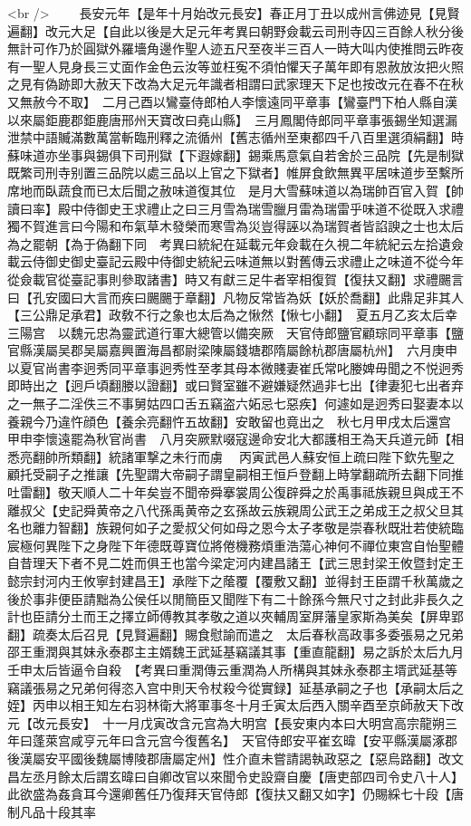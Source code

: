 <br />
　　長安元年【是年十月始改元長安】春正月丁丑以成州言佛迹見【見賢遍翻】改元大足【自此以後是大足元年考異曰朝野僉載云司刑寺囚三百餘人秋分後無計可作乃於圓獄外羅墻角邊作聖人迹五尺至夜半三百人一時大叫内使推問云昨夜有一聖人見身長三丈面作金色云汝等並枉寃不須怕懼天子萬年即有恩赦放汝把火照之見有偽跡即大赦天下改為大足元年識者相謂曰武家理天下足也按改元在春不在秋又無赦今不取】　二月己酉以鸞臺侍郎柏人李懷遠同平章事【鸞臺門下柏人縣自漢以來屬鉅鹿郡鉅鹿唐邢州天寶改曰堯山縣】　三月鳳閣侍郎同平章事張錫坐知選漏泄禁中語贓滿數萬當斬臨刑釋之流循州【舊志循州至東都四千八百里選須絹翻】時蘇味道亦坐事與錫俱下司刑獄【下遐嫁翻】錫乘馬意氣自若舍於三品院【先是制獄既繁司刑寺别置三品院以處三品以上官之下獄者】帷屏食飲無異平居味道步至繫所席地而臥蔬食而已太后聞之赦味道復其位　是月大雪蘇味道以為瑞帥百官入賀【帥讀曰率】殿中侍御史王求禮止之曰三月雪為瑞雪臘月雷為瑞雷乎味道不從既入求禮獨不賀進言曰今陽和布氣草木發榮而寒雪為災豈得誣以為瑞賀者皆諂諛之士也太后為之罷朝【為于偽翻下同　考異曰統紀在延載元年僉載在久視二年統紀云左拾遺僉載云侍御史御史臺記云殿中侍御史統紀云味道無以對舊傳云求禮止之味道不從今年從僉載官從臺記事則參取諸書】時又有獻三足牛者宰相復賀【復扶又翻】求禮颺言曰【孔安國曰大言而疾曰颺颺于章翻】凡物反常皆為妖【妖於喬翻】此鼎足非其人【三公鼎足承君】政敎不行之象也太后為之愀然【愀七小翻】　夏五月乙亥太后幸三陽宫　以魏元忠為靈武道行軍大總管以備突厥　天官侍郎鹽官顧琮同平章事【鹽官縣漢屬吴郡吴屬嘉興置海昌都尉梁陳屬錢塘郡隋屬餘杭郡唐屬杭州】　六月庚申以夏官尚書李迥秀同平章事迥秀性至孝其母本微賤妻崔氏常叱媵婢毋聞之不悦迥秀即時出之【迥戶頃翻媵以證翻】或曰賢室雖不避嫌疑然過非七出【律妻犯七出者弃之一無子二淫佚三不事舅姑四口舌五竊盗六妬忌七惡疾】何遽如是迥秀曰娶妻本以養親今乃違忤顔色【養余亮翻忤五故翻】安敢留也竟出之　秋七月甲戌太后還宫　甲申李懷遠罷為秋官尚書　八月突厥默啜寇邊命安北大都護相王為天兵道元師【相悉亮翻帥所類翻】統諸軍撃之未行而虜　丙寅武邑人蘇安恒上疏曰陛下欽先聖之顧托受嗣子之推讓【先聖謂大帝嗣子謂皇嗣相王恒戶登翻上時掌翻疏所去翻下同推吐雷翻】敬天順人二十年矣豈不聞帝舜搴裳周公復辟舜之於禹事祗族親旦與成王不離叔父【史記舜黄帝之八代孫禹黄帝之玄孫故云族親周公武王之弟成王之叔父旦其名也離力智翻】族親何如子之愛叔父何如母之恩今太子孝敬是崇春秋既壯若使統臨宸極何異陛下之身陛下年德既尊寶位將倦機務煩重浩蕩心神何不禪位東宫自怡聖體自昔理天下者不見二姓而俱王也當今梁定河内建昌諸王【武三思封梁王攸暨封定王懿宗封河内王攸寧封建昌王】承陛下之䕃覆【覆敷又翻】並得封王臣謂千秋萬歲之後於事非便臣請黜為公侯任以閒簡臣又聞陛下有二十餘孫今無尺寸之封此非長久之計也臣請分土而王之擇立師傅教其孝敬之道以夾輔周室屏藩皇家斯為美矣【屏卑郢翻】疏奏太后召見【見賢遍翻】賜食慰諭而遣之　太后春秋高政事多委張易之兄弟邵王重潤與其妹永泰郡主主婿魏王武延基竊議其事【重直龍翻】易之訴於太后九月壬申太后皆逼令自殺　【考異曰重潤傳云重潤為人所構與其妹永泰郡主壻武延基等竊議張易之兄弟何得恣入宫中則天令杖殺今從實録】延基承嗣之子也【承嗣太后之姪】丙申以相王知左右羽林衛大將軍事冬十月壬寅太后西入關辛酉至京師赦天下改元【改元長安】　十一月戊寅改含元宫為大明宫【長安東内本曰大明宫高宗龍朔三年曰蓬萊宫咸亨元年曰含元宫今復舊名】　天官侍郎安平崔玄暐【安平縣漢屬涿郡後漢屬安平國後魏屬博陵郡唐屬定州】性介直未嘗請謁執政惡之【惡烏路翻】改文昌左丞月餘太后謂玄暐曰自卿改官以來聞令史設齋自慶【唐吏部四司令史八十人】此欲盛為姦貪耳今還卿舊任乃復拜天官侍郎【復扶又翻又如字】仍賜綵七十段【唐制凡品十段其率